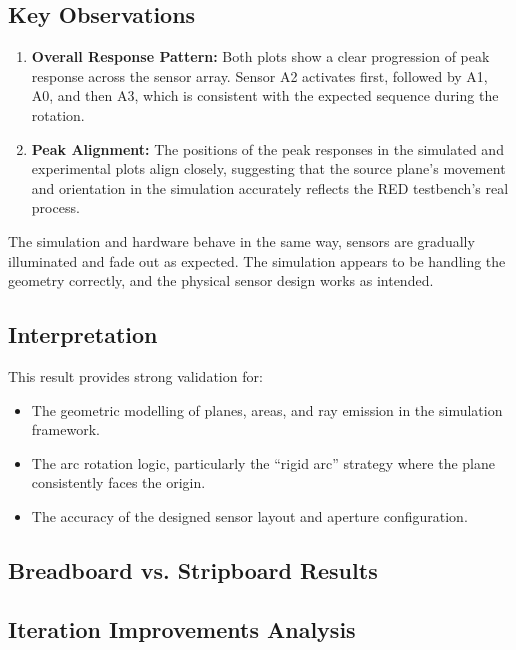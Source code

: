 \subsection*{Key Observations}
\begin{enumerate}
    \item \textbf{Overall Response Pattern:} Both plots show a clear progression of peak response across the sensor array. Sensor A2 activates first, followed by A1, A0, and then A3, which is consistent with the expected sequence during the rotation.
    
    \item \textbf{Peak Alignment:} The positions of the peak responses in the simulated and experimental plots align closely, suggesting that the source plane's movement and orientation in the simulation accurately reflects the RED testbench's real process.

\end{enumerate}

The simulation and hardware behave in the same way, sensors are gradually illuminated and fade out as expected. The simulation appears to be handling the geometry correctly, and the physical sensor design works as intended.


\subsection*{Interpretation}
This result provides strong validation for:
\begin{itemize}
    \item The geometric modelling of planes, areas, and ray emission in the simulation framework.
    \item The arc rotation logic, particularly the ``rigid arc'' strategy where the plane consistently faces the origin.
    \item The accuracy of the designed sensor layout and aperture configuration.
\end{itemize}


\subsection{Breadboard vs. Stripboard Results}

\subsection{Iteration Improvements Analysis}

